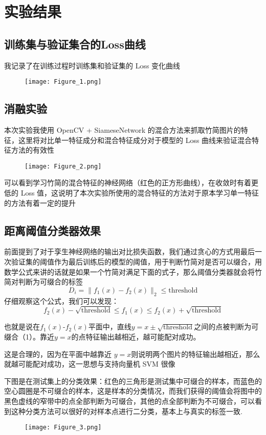 \documentclass{article}
\begin{document}
\section{实验结果}

\subsection{训练集与验证集合的Loss曲线}

我记录了在训练过程时训练集和验证集的 Loss 变化曲线

\begin{figure}[H]
\centering
\texttt{[image: Figure\_1.png]}
\end{figure}

\subsection{消融实验}

本次实验我使用 OpenCV + SiameseNetwork 的混合方法来抓取竹简图片的特征，这里将对比单一特征成分和混合特征成分对于模型的 Loss 曲线来验证混合特征方法的有效性
\begin{figure}[H]
\centering
\texttt{[image: Figure\_2.png]}
\end{figure}

可以看到学习竹简的混合特征的神经网络（红色的正方形曲线），在收敛时有着更低的 Loss 值，这说明了本次实验所使用的混合特征的方法对于原本学习单一特征的方法有着一定的提升

\subsection{距离阈值分类器效果}

前面提到了对于孪生神经网络的输出对比损失函数，我们通过贪心的方式用最后一次验证集的阈值作为最后训练后的模型的阈值，用于判断竹简对是否可以缀合，用数学公式来讲的话就是如果一个竹简对满足下面的式子，那么阈值分类器就会将竹简对判断为可缀合的标签
\[
D_i=\|f_1(x)-f_2(x)\|_2 \leq \text{threshold}
\]
仔细观察这个公式，我们可以发现：
\[
f_2(x)-\sqrt{\text{threshold}} \leq f_1(x) \leq  f_2(x) + \sqrt{\text{threshold}}
\]

也就是说在$f_1(x)$-$f_2(x)$平面中，直线$y=x \pm \sqrt{\text{threshold}}$之间的点被判断为可缀合（1）。靠近$y=x$的点特征输出越相近，越可能配对成功。

这是合理的，因为在平面中越靠近 $y=x$则说明两个图片的特征输出越相近，那么就越可能配对成功，这一思想与支持向量机 SVM 很像

下图是在测试集上的分类效果：红色的三角形是测试集中可缀合的样本，而蓝色的空心圆圈是不可缀合的样本，这是样本的分类情况，而我们获得的阈值会将图中的黑色虚线的窄带中的点全部判断为可缀合，其他的点全部判断为不可缀合，可以看到这种分类方法可以很好的对样本点进行二分类，基本上与真实的标签一致.
\begin{figure}[H]
\centering
\texttt{[image: Figure\_3.png]}
\end{figure}
\end{document}
